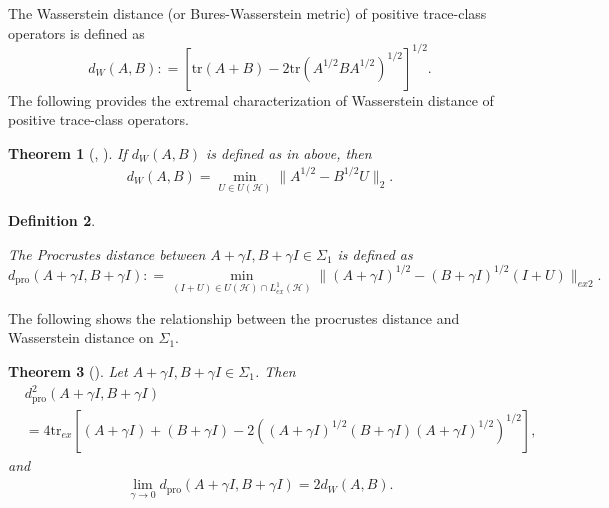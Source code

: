 \documentclass[12pt,reqno]{amsart}
\newtheorem{theorem}{Theorem}[section]
\newtheorem{Definition}[theorem]{Definition}
\newenvironment{definition}{\begin{Definition}\begin{em}}{\end{em}\end{Definition}}
\begin{document}
The Wasserstein distance (or Bures-Wasserstein metric) of positive trace-class operators is defined as
\begin{equation*} \label{metric}
d_W(A,B) : =  \left[ \mathrm{tr} ( A + B ) - 2 \mathrm{tr} (A^{1/2} B A^{1/2})^{1/2} \right]^{1/2}.
\end{equation*}
The following provides the extremal characterization of Wasserstein distance of positive trace-class operators.
\begin{theorem}[\cite{G}, \cite{MPZ}]
If $d_W(A,B)$ is defined as in above, then
\begin{align*}
d_W(A,B) = \min_{U \in U(\mathcal{H})} \| A^{1/2} - B^{1/2}U \|_2.
\end{align*}
\end{theorem}

\begin{definition}
The Procrustes distance between $A + \gamma I, B + \gamma I \in \Sigma_1$ is defined as
\begin{displaymath}
d_{\mathrm{pro}}(A + \gamma I, B + \gamma I) : = \min_{(I+U) \in U(\mathcal{H}) \cap L^{1}_{ex} (\mathcal{H})} \| (A + \gamma I)^{1/2} - (B + \gamma I)^{1/2} (I + U) \|_{ex2}.
\end{displaymath}
\end{definition}

The following shows the relationship between the procrustes distance and Wasserstein distance on $\Sigma_{1}$.
\begin{theorem}[\cite{M-1}] \label{T:Wass-form}
Let $A + \gamma I, B + \gamma I \in \Sigma_{1}$. Then
\begin{displaymath}
\begin{split}
& d^2_{\mathrm{pro}}(A + \gamma I, B + \gamma I) \\
&= 4 \mathrm{tr}_{ex} \left[ (A + \gamma I) + (B + \gamma I) - 2 ((A + \gamma I)^{1/2} (B + \gamma I) (A + \gamma I)^{1/2})^{1/2} \right],
\end{split}
\end{displaymath}
and
\begin{align*}
\lim_{\gamma \rightarrow 0} d_{\mathrm{pro}}(A + \gamma I, B + \gamma I) = 2 d_W(A, B).
\end{align*}
\end{theorem}

\end{document}
